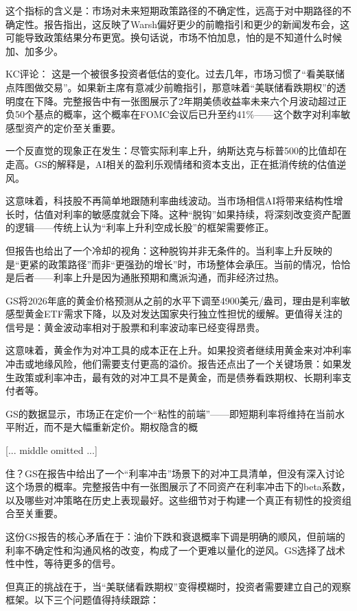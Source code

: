 \documentclass[11pt]{ctexart}
\begin{document}
这个指标的含义是：市场对未来短期政策路径的不确定性，远高于对中期路径的不确定性。报告指出，这反映了Warsh偏好更少的前瞻指引和更少的新闻发布会，这可能导致政策结果分布更宽。换句话说，市场不怕加息，怕的是不知道什么时候加、加多少。

KC评论： 这是一个被很多投资者低估的变化。过去几年，市场习惯了“看美联储点阵图做交易”。如果新主席有意减少前瞻指引，那意味着“美联储看跌期权”的透明度在下降。完整报告中有一张图展示了2年期美债收益率未来六个月波动超过正负50个基点的概率，这个概率在FOMC会议后已升至约41\%——这个数字对利率敏感型资产的定价至关重要。

一个反直觉的现象正在发生：尽管实际利率上升，纳斯达克与标普500的比值却在走高。GS的解释是，AI相关的盈利乐观情绪和资本支出，正在抵消传统的估值逆风。

这意味着，科技股不再简单地跟随利率曲线波动。当市场相信AI将带来结构性增长时，估值对利率的敏感度就会下降。这种“脱钩”如果持续，将深刻改变资产配置的逻辑——传统上认为“利率上升利空成长股”的框架需要修正。

但报告也给出了一个冷却的视角：这种脱钩并非无条件的。当利率上升反映的是“更紧的政策路径”而非“更强劲的增长”时，市场整体会承压。当前的情况，恰恰是后者——利率上升是因为通胀预期和鹰派沟通，而非经济过热。

GS将2026年底的黄金价格预测从之前的水平下调至4900美元/盎司，理由是利率敏感型黄金ETF需求下降，以及对发达国家央行独立性担忧的缓解。更值得关注的信号是：黄金波动率相对于股票和利率波动率已经变得昂贵。

这意味着，黄金作为对冲工具的成本正在上升。如果投资者继续用黄金来对冲利率冲击或地缘风险，他们需要支付更高的溢价。报告还点出了一个关键场景：如果发生政策或利率冲击，最有效的对冲工具不是黄金，而是债券看跌期权、长期利率支付者等。

GS的数据显示，市场正在定价一个“粘性的前端”——即短期利率将维持在当前水平附近，而不是大幅重新定价。期权隐含的概

[... middle omitted ...]

住？GS在报告中给出了一个“利率冲击”场景下的对冲工具清单，但没有深入讨论这个场景的概率。完整报告中有一张图展示了不同资产在利率冲击下的beta系数，以及哪些对冲策略在历史上表现最好。这些细节对于构建一个真正有韧性的投资组合至关重要。

这份GS报告的核心矛盾在于：油价下跌和衰退概率下调是明确的顺风，但前端的利率不确定性和沟通风格的改变，构成了一个更难以量化的逆风。GS选择了战术性中性，等待更多的信号。

但真正的挑战在于，当“美联储看跌期权”变得模糊时，投资者需要建立自己的观察框架。以下三个问题值得持续跟踪：
\end{document}
